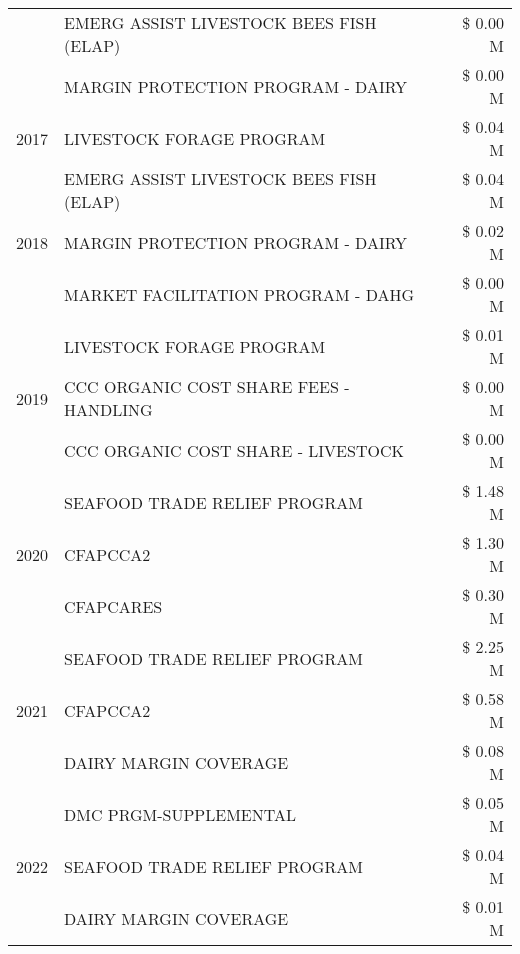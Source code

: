\begin{tabular}{llr}
 & EMERG ASSIST LIVESTOCK BEES FISH (ELAP) & \$ 0.00 M \\
 & MARGIN PROTECTION PROGRAM - DAIRY & \$ 0.00 M \\
\cline{1-3}
2017 & LIVESTOCK FORAGE PROGRAM & \$ 0.04 M \\
\cline{1-3}
\multirow[t]{3}{*}{2018} & EMERG ASSIST LIVESTOCK BEES FISH (ELAP) & \$ 0.04 M \\
 & MARGIN PROTECTION PROGRAM - DAIRY & \$ 0.02 M \\
 & MARKET FACILITATION PROGRAM - DAHG & \$ 0.00 M \\
\cline{1-3}
\multirow[t]{3}{*}{2019} & LIVESTOCK FORAGE PROGRAM & \$ 0.01 M \\
 & CCC ORGANIC COST SHARE FEES - HANDLING & \$ 0.00 M \\
 & CCC ORGANIC COST SHARE - LIVESTOCK & \$ 0.00 M \\
\cline{1-3}
\multirow[t]{3}{*}{2020} & SEAFOOD TRADE RELIEF PROGRAM & \$ 1.48 M \\
 & CFAPCCA2 & \$ 1.30 M \\
 & CFAPCARES & \$ 0.30 M \\
\cline{1-3}
\multirow[t]{3}{*}{2021} & SEAFOOD TRADE RELIEF PROGRAM & \$ 2.25 M \\
 & CFAPCCA2 & \$ 0.58 M \\
 & DAIRY MARGIN COVERAGE & \$ 0.08 M \\
\cline{1-3}
\multirow[t]{3}{*}{2022} & DMC PRGM-SUPPLEMENTAL & \$ 0.05 M \\
 & SEAFOOD TRADE RELIEF PROGRAM & \$ 0.04 M \\
 & DAIRY MARGIN COVERAGE & \$ 0.01 M \\
\cline{1-3}
\bottomrule
\end{tabular}
